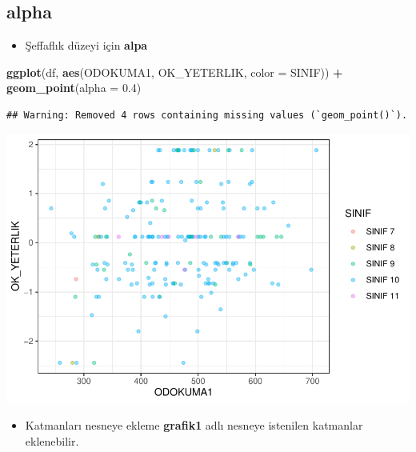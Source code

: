 \documentclass[
  oneside]{book}
\newenvironment{Shaded}{\begin{snugshade}}{\end{snugshade}}
\newcommand{\AttributeTok}[1]{\textcolor[rgb]{0.13,0.29,0.53}{#1}}
\newcommand{\FloatTok}[1]{\textcolor[rgb]{0.00,0.00,0.81}{#1}}
\newcommand{\FunctionTok}[1]{\textcolor[rgb]{0.13,0.29,0.53}{\textbf{#1}}}
\newcommand{\NormalTok}[1]{#1}
\newcommand{\SpecialCharTok}[1]{\textcolor[rgb]{0.81,0.36,0.00}{\textbf{#1}}}
\providecommand{\tightlist}{%
  \setlength{\itemsep}{0pt}\setlength{\parskip}{0pt}}
\begin{document}
\hypertarget{alpha}{%
\subsection{alpha}\label{alpha}}

\begin{itemize}
\tightlist
\item
  Şeffaflık düzeyi için \textbf{alpa}
\end{itemize}

\begin{Shaded}
\begin{Highlighting}[]
\FunctionTok{ggplot}\NormalTok{(df, }\FunctionTok{aes}\NormalTok{(ODOKUMA1, OK\_YETERLIK, }\AttributeTok{color =}\NormalTok{ SINIF)) }\SpecialCharTok{+}
  \FunctionTok{geom\_point}\NormalTok{(}\AttributeTok{alpha =} \FloatTok{0.4}\NormalTok{)}
\end{Highlighting}
\end{Shaded}

\begin{verbatim}
## Warning: Removed 4 rows containing missing values (`geom_point()`).
\end{verbatim}

\begin{center}\includegraphics[width=1\linewidth]{15-betimleyici-istatistik_files/figure-latex/unnamed-chunk-47-1} \end{center}

\begin{itemize}
\tightlist
\item
  Katmanları nesneye ekleme
  \textbf{grafik1} adlı nesneye istenilen katmanlar eklenebilir.
\end{itemize}
\end{document}
